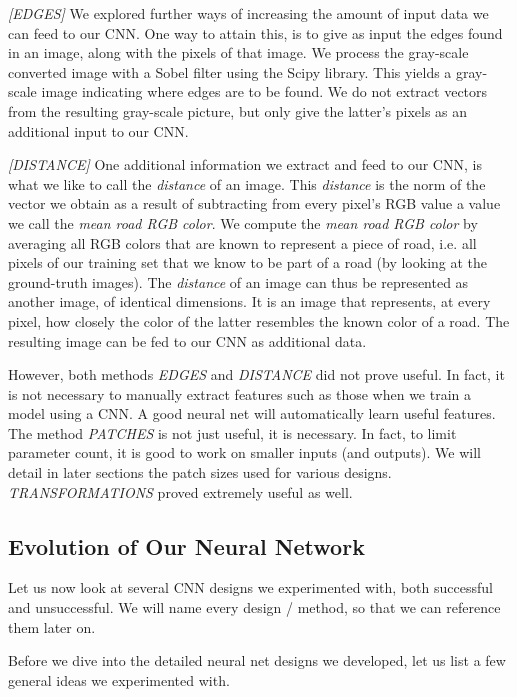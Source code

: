 \documentclass[10pt,conference,compsocconf]{IEEEtran}
\begin{document}
\textit{[EDGES]}   
We explored further ways of increasing the amount of input data we can feed to our CNN. One way to attain this, is to give as input the edges found in an image, along with the pixels of that image. We process the gray-scale converted image with a Sobel filter using the Scipy library. This yields a gray-scale image indicating where edges are to be found. We do not extract vectors from the resulting gray-scale picture, but only give the latter's pixels as an additional input to our CNN.

\textit{[DISTANCE]}   
One additional information we extract and feed to our CNN, is what we like to call the \textit{distance} of an image. This  \textit{distance} is the norm of the vector we obtain as a result of subtracting from every pixel's RGB value a value we call the \textit{mean road RGB color}. We compute the \textit{mean road RGB color} by averaging all RGB colors that are known to represent a piece of road, i.e. all pixels of our training set that we know to be part of a road (by looking at the ground-truth images). The \textit{distance} of an image can thus be represented as another image, of identical dimensions. It is an image that represents, at every pixel, how closely the color of the latter resembles the known color of a road. The resulting image can be fed to our CNN as additional data.

However, both methods \textit{EDGES} and \textit{DISTANCE} did not prove useful. In fact, it is not necessary to manually extract features such as those when we train a model using a CNN. A good neural net will automatically learn useful features. The method \textit{PATCHES} is not just useful, it is necessary. In fact, to limit parameter count, it is good to work on smaller inputs (and outputs). We will detail in later sections the patch sizes used for various designs. \textit{TRANSFORMATIONS} proved extremely useful as well.



\subsection{Evolution of Our Neural Network} 
\label{ssec:technique}

Let us now look at several CNN designs we experimented with, both successful and unsuccessful. We will name every design / method, so that we can reference them later on.

Before we dive into the detailed neural net designs we developed, let us list a few general ideas we experimented with.
\end{document}
